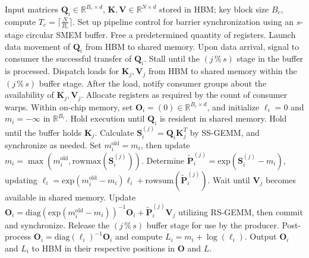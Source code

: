 \begin{enumerate}
\begin{algorithm}[H]
    \caption{\small\label{alg:flash3_wgmma_ws_only}\textsc{FlashAttention-3} forward pass \textbf{excluding} intra-consumer overlap -- CTA perspective}
    \begin{algorithmic}[1]
\REQUIRE Input matrices $\mathbf{Q}_i \in \mathbb{R}^{B_r \times d}$, $\mathbf{K}, \mathbf{V} \in \mathbb{R}^{N \times d}$ stored in HBM; key block size $B_c$, compute $T_c = \lceil \frac{N}{B_c} \rceil$.
\STATE Set up pipeline control for barrier synchronization using an $s$-stage circular SMEM buffer.
\STATE Free a predetermined quantity of registers.
\STATE Launch data movement of $\mathbf{Q}_i$ from HBM to shared memory.
\STATE Upon data arrival, signal to consumer the successful transfer of $\mathbf{Q}_i$.
    \STATE Stall until the $(j\,\%\,s)$ stage in the buffer is processed.
    \STATE Dispatch loads for $\mathbf{K}_j, \mathbf{V}_j$ from HBM to shared memory within the $(j\,\%\,s)$ buffer stage.
    \STATE After the load, notify consumer groups about the availability of $\mathbf{K}_j, \mathbf{V}_j$.
\ENDFOR
\ELSE \STATE Allocate registers as required by the count of consumer warps.
\STATE Within on-chip memory, set $\mathbf{O}_i = (0) \in \mathbb{R}^{B_r \times d}$, and initialize $\ell_i = 0$ and $m_i = -\infty$ in $\mathbb{R}^{B_r}$.
\STATE Hold execution until $\mathbf{Q}_i$ is resident in shared memory.
\STATE Hold until the buffer holds $\mathbf{K}_j$.
\STATE Calculate $\mathbf{S}_i^{(j)} = \mathbf{Q}_i \mathbf{K}_j^T$ by SS-GEMM, and synchronize as needed. \label{alg:ws_only_gemm1}
\STATE Set $m_i^{\mathrm{old}} = m_i$, then update $m_i = \max(m_i^{\mathrm{old}}, \mathrm{rowmax}(\mathbf{S}_i^{(j)}))$. \label{code-ws:softmax_start}
\STATE Determine $\widetilde{\mathbf{P}}_i^{(j)} = \mathrm{exp}(\mathbf{S}_i^{(j)} - m_i)$, updating $\ell_i = \mathrm{exp}(m_i^{\mathrm{old}} - m_i) \ell_i + \mathrm{rowsum}(\widetilde{\mathbf{P}}_i^{(j)})$. \label{code-ws:softmax_end}
\STATE Wait until $\mathbf{V}_j$ becomes available in shared memory.
\STATE Update $\mathbf{O}_i = \mathrm{diag}(\mathrm{exp}(m_i^{\mathrm{old}} - m_i))^{-1} \mathbf{O}_i + \widetilde{\mathbf{P}}_i^{(j)} \mathbf{V}_j$ utilizing RS-GEMM, then commit and synchronize. \label{alg:ws_only_gemm2}
\STATE Release the $(j\,\%\,s)$ buffer stage for use by the producer.
\ENDFOR
\STATE Post-process $\mathbf{O}_i = \mathrm{diag}(\ell_i)^{-1} \mathbf{O}_i$ and compute $L_i = m_i + \log(\ell_i)$.
\STATE Output $\mathbf{O}_i$ and $L_i$ to HBM in their respective positions in $\mathbf{O}$ and $L$.
\ENDIF
\end{algorithmic}
\end{algorithm}


\end{enumerate}
